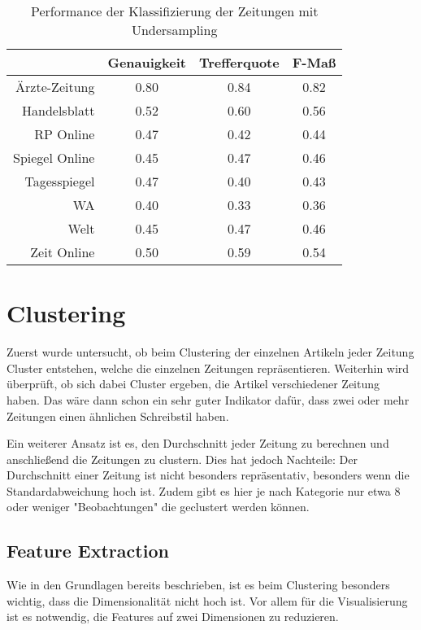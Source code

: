 \begin{table}[h]
\centering
\begin{spacing}{1.25}
\begin{tabular}[t]{rccc}
\toprule
~ & Genauigkeit & Trefferquote & F-Maß\\
\midrule
Ärzte-Zeitung & 0.80 & 0.84 & 0.82\\
Handelsblatt & 0.52 & 0.60 & 0.56\\
RP Online & 0.47 & 0.42 & 0.44\\
Spiegel Online & 0.45 & 0.47 & 0.46\\
Tagesspiegel & 0.47 & 0.40 & 0.43\\
WA & 0.40 & 0.33 & 0.36\\
Welt & 0.45 & 0.47 & 0.46\\
Zeit Online & 0.50 & 0.59 & 0.54\\
\bottomrule
\end{tabular}
\caption{Performance der Klassifizierung der Zeitungen mit Undersampling}
\label{undersampling_individual}
\end{spacing}
\end{table}



\section{Clustering}
Zuerst wurde untersucht, ob beim Clustering der einzelnen Artikeln jeder Zeitung Cluster entstehen, welche die einzelnen Zeitungen repräsentieren. Weiterhin wird überprüft, ob sich dabei Cluster ergeben, die Artikel verschiedener Zeitung haben. Das wäre dann schon ein sehr guter Indikator dafür, dass zwei oder mehr Zeitungen einen ähnlichen Schreibstil haben.

Ein weiterer Ansatz ist es, den Durchschnitt jeder Zeitung zu berechnen und anschließend die Zeitungen zu clustern. Dies hat jedoch Nachteile: Der Durchschnitt einer Zeitung ist nicht besonders repräsentativ, besonders wenn die Standardabweichung hoch ist. Zudem gibt es hier je nach Kategorie nur etwa 8 oder weniger "Beobachtungen" die geclustert werden können.
\subsection{Feature Extraction}
Wie in den Grundlagen bereits beschrieben, ist es beim Clustering besonders wichtig, dass die Dimensionalität nicht hoch ist. Vor allem für die Visualisierung ist es notwendig, die Features auf zwei Dimensionen zu reduzieren.
